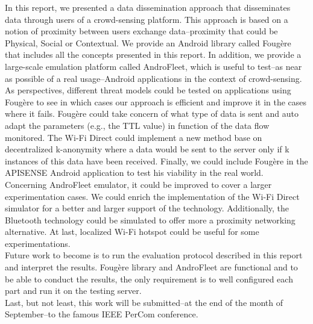 

In this report, we presented a data dissemination approach that disseminates data through users of a crowd-sensing platform.
This approach is based on a notion of proximity between users exchange data--proximity that could be Physical, Social or Contextual.
We provide an Android library called Foug\`ere that includes all the concepts presented in this report. 
In addition, we provide a large-scale emulation platform called AndroFleet, which is useful to test--as near as possible of a real usage--Android applications in the context of crowd-sensing.
\\

As perspectives, different threat models could be tested on applications using Foug\`ere to see in which cases our approach is efficient and improve it in the cases where it fails.
Foug\`ere could take concern of what type of data is sent and auto adapt the parameters (e.g., the TTL value) in function of the data flow monitored.
The Wi-Fi Direct could implement a new method base on decentralized k-anonymity where a data would be sent to the server only if k instances of this data have been received.
Finally, we could include Foug\`ere in the APISENSE Android application to test his viability in the real world.
\\

Concerning AndroFleet emulator, it could be improved to cover a larger experimentation cases.
We could enrich the implementation of the Wi-Fi Direct simulator for a better and larger support of the technology.
Additionally, the Bluetooth technology could be simulated to offer more a proximity networking alternative.
At last, localized Wi-Fi hotspot could be useful for some experimentations.
\\

Future work to become is to run the evaluation protocol described in this report and interpret the results.
Foug\`ere library and AndroFleet are functional and to be able to conduct the results, the only requirement is to well configured each part and run it on the testing server.
\\

Last, but not least, this work will be submitted--at the end of the month of September--to the famous IEEE PerCom conference. 

